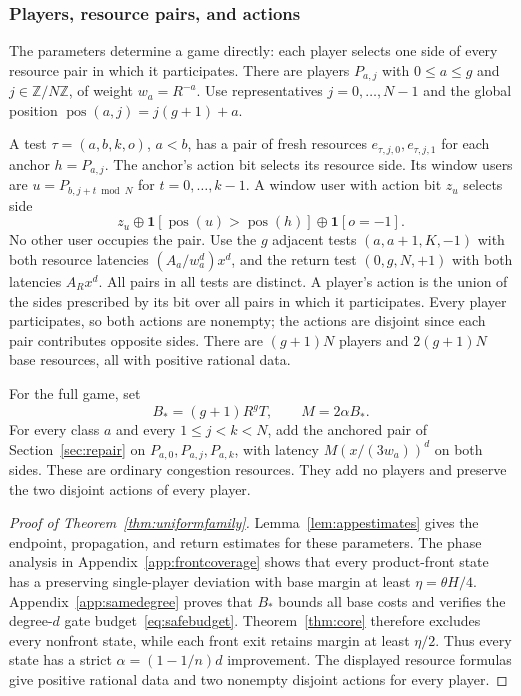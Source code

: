 \documentclass[manuscript,review,anonymous]{acmart}
\newcommand{\ind}{\mathbf 1}
\newcommand{\xor}{\mathbin{\oplus}}
\DeclareMathOperator{\pos}{pos}
\begin{document}
\subsubsection{Players, resource pairs, and actions}\label{app:resources}
The parameters determine a game directly: each player selects one side of every resource pair in which it participates.
There are players $P_{a,j}$ with $0\le a\le g$ and $j\in\mathbb Z/N\mathbb Z$, of weight $w_a=R^{-a}$. Use representatives $j=0,\ldots,N-1$ and the global position $\pos(a,j)=j(g+1)+a$.

A test $\tau=(a,b,k,o)$, $a<b$, has a pair of fresh resources $e_{\tau,j,0},e_{\tau,j,1}$ for each anchor $h=P_{a,j}$. The anchor's action bit selects its resource side. Its window users are $u=P_{b,j+t\bmod N}$ for $t=0,\ldots,k-1$. A window user with action bit $z_u$ selects side
\begin{equation}\label{eq:appincidence}
 z_u\xor\ind[\pos(u)>\pos(h)]\xor\ind[o=-1].
\end{equation}
No other user occupies the pair. Use the $g$ adjacent tests $(a,a+1,K,-1)$ with both resource latencies $(A_a/w_a^d)x^d$, and the return test $(0,g,N,+1)$ with both latencies $A_Rx^d$. All pairs in all tests are distinct. A player's action is the union of the sides prescribed by its bit over all pairs in which it participates. Every player participates, so both actions are nonempty; the actions are disjoint since each pair contributes opposite sides. There are $(g+1)N$ players and $2(g+1)N$ base resources, all with positive rational data.


For the full game, set
\begin{equation}\label{eq:maincompletion}
 B_*=(g+1)R^gT,\qquad M=2\alpha B_*.
\end{equation}
For every class $a$ and every $1\le j<k<N$, add the anchored pair of Section~\ref{sec:repair} on $P_{a,0},P_{a,j},P_{a,k}$, with latency $M(x/(3w_a))^d$ on both sides. These are ordinary congestion resources. They add no players and preserve the two disjoint actions of every player.

\begin{proof}[Proof of Theorem~\ref{thm:uniformfamily}]
Lemma~\ref{lem:appestimates} gives the endpoint, propagation, and return estimates for these parameters. The phase analysis in Appendix~\ref{app:frontcoverage} shows that every product-front state has a preserving single-player deviation with base margin at least $\eta=\theta H/4$. Appendix~\ref{app:samedegree} proves that $B_*$ bounds all base costs and verifies the degree-$d$ gate budget~\eqref{eq:safebudget}. Theorem~\ref{thm:core} therefore excludes every nonfront state, while each front exit retains margin at least $\eta/2$. Thus every state has a strict $\alpha=(1-1/n)d$ improvement. The displayed resource formulas give positive rational data and two nonempty disjoint actions for every player.
\end{proof}
\end{document}
